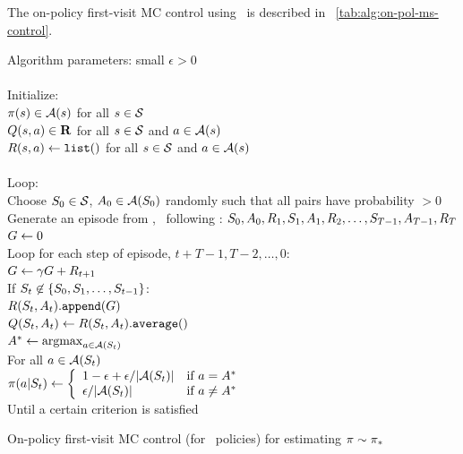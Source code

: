The on-policy first-visit MC control using \epsgreedy\
is described in \tablename~\ref{tab:alg:on-pol-ms-control}.


\begin{table}
\beginalg
Algorithm parameters: small $\epsilon>0$\\
\\
Initialize:\\
\> $\pi(s) \in \mathcal{A}(s)$ for all $s\in\mathcal{S}$\\
\> $Q(s,a) \in \mathbf{R}$ for all $s\in\mathcal{S}$ and $a\in\mathcal{A}(s)$\\
\> $R(s, a) \leftarrow {\tt list()}$ for all $s\in\mathcal{S}$ and $a\in\mathcal{A}(s)$\\
\\
Loop: \\
\> Choose $ \in \stateset$, $ \in \actionset(\state{0})$ randomly such that all pairs have probability $> 0$\\
\> Generate an episode from \state{0}, \action{0}\ following \pol: $S_{0}, A_{0}, R_{1}, S_{1}, A_{1}, R_{2}, \ldots, S_{T-1}, A_{T-1}, R_{T}$\\
\> $G \leftarrow 0$\\
\> Loop for each step of episode, $t+T-1, T-2, \ldots, 0$:\\
\> \> $G \leftarrow \gamma G + R_{t+1}$\\
\> \> If $S_{t} \not\in \{S_{0}, S_{1}, \ldots, S_{t-1}\}$:\\
\> \> \> $R(S_{t}, A_t){\tt.append}(G)$\\
\> \> \> $Q(S_{t}, A_t) \leftarrow R(S_{t}, A_t){\tt .average()}$\\
\> \> \> $A^\ast \leftarrow \mathop{\mathrm {argmax}}_{a\in\mathcal{A}(S_{t})}$\\
\> \> \> For all $a \in \mathcal{A}(S_{t})$\\
\> \> \> \> $\pi(a|S_{t}) \leftarrow \left\{\begin{array}{ll}
1-\epsilon + \epsilon / |\mathcal{A}(S_{t})| & \mbox{if } a = A^\ast\\
\epsilon / |\mathcal{A}(S_{t})| & \mbox{if } a \neq A^\ast
\end{array}\right.$\\
Until a certain criterion is satisfied
\endalg
\caption{On-policy first-visit MC control (for \epssoft\ policies) for estimating $\pi \sim {\ensuremath{\pi}}_\ast$}
\label{tab:alg:on-pol-ms-control}
\end{table}



